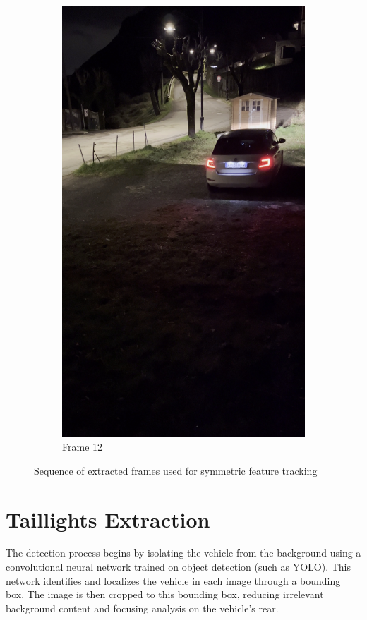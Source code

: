 \begin{figure}[h!]
\begin{subfigure}[b]{0.24\textwidth}
        \includegraphics[width=\textwidth]{Images/featureExtractions/frame12.jpg}
        \caption{Frame 12}
    \end{subfigure}

    \caption{Sequence of extracted frames used for symmetric feature tracking}
    \label{fig:frames_sequence}
\end{figure}

\section{Taillights Extraction}
The detection process begins by isolating the vehicle from the background using a convolutional neural network trained on object detection (such as YOLO). This network identifies and localizes the vehicle in each image through a bounding box. The image is then cropped to this bounding box, reducing irrelevant background content and focusing analysis on the vehicle’s rear.

